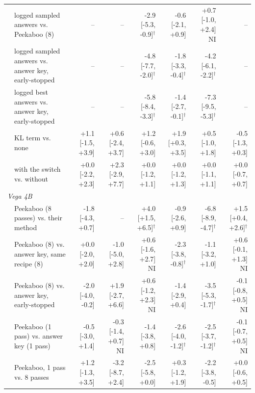 \begin{table}[tbp]
{\begin{tabular}{llrrrrrr}
 & logged sampled answers vs. Peekaboo (8) & -- & -- & -2.9 {\scriptsize[-5.3, -0.9]}$^{\dagger}$ & -0.6 {\scriptsize[-2.1, +0.9]} & +0.7 {\scriptsize[-1.0, +2.4]} NI & -- \\
 & logged sampled answers vs. answer key, early-stopped & -- & -- & -4.8 {\scriptsize[-7.7, -2.0]}$^{\dagger}$ & -1.8 {\scriptsize[-3.3, -0.4]}$^{\dagger}$ & -4.2 {\scriptsize[-6.1, -2.2]}$^{\dagger}$ & -- \\
 & logged best answers vs. answer key, early-stopped & -- & -- & -5.8 {\scriptsize[-8.4, -3.3]}$^{\dagger}$ & -1.4 {\scriptsize[-2.7, -0.1]}$^{\dagger}$ & -7.3 {\scriptsize[-9.5, -5.3]}$^{\dagger}$ & -- \\
 & KL term vs. none & +1.1 {\scriptsize[-1.5, +3.9]} & +0.6 {\scriptsize[-2.4, +3.7]} & +1.2 {\scriptsize[-0.6, +3.0]} & +1.9 {\scriptsize[+0.3, +3.5]} & +0.5 {\scriptsize[-1.0, +1.8]} & -0.5 {\scriptsize[-1.3, +0.3]} \\
 & with the switch vs. without & +0.0 {\scriptsize[-2.2, +2.3]} & +2.3 {\scriptsize[-2.9, +7.7]} & +0.0 {\scriptsize[-1.2, +1.1]} & +0.0 {\scriptsize[-1.2, +1.3]} & +0.0 {\scriptsize[-1.1, +1.1]} & +0.0 {\scriptsize[-0.7, +0.7]} \\
\midrule
\multicolumn{8}{l}{\textit{Vega 4B}} \\
 & Peekaboo (8 passes) vs. their method & -1.8 {\scriptsize[-4.3, +0.7]} & -- & +4.0 {\scriptsize[+1.5, +6.5]}$^{\dagger}$ & -0.9 {\scriptsize[-2.6, +0.9]} & -6.8 {\scriptsize[-8.9, -4.7]}$^{\dagger}$ & +1.5 {\scriptsize[+0.4, +2.6]}$^{\dagger}$ \\
 & Peekaboo (8) vs. answer key, same recipe (8) & +0.0 {\scriptsize[-2.0, +2.0]} & -1.0 {\scriptsize[-5.0, +2.8]} & +0.6 {\scriptsize[-1.6, +2.7]} NI & -2.3 {\scriptsize[-3.8, -0.8]}$^{\dagger}$ & -1.1 {\scriptsize[-3.2, +1.0]} & +0.6 {\scriptsize[-0.1, +1.3]} NI \\
 & Peekaboo (8) vs. answer key, early-stopped & -2.0 {\scriptsize[-4.0, -0.2]} & +1.9 {\scriptsize[-2.7, +6.6]} & +0.6 {\scriptsize[-1.2, +2.3]} NI & -1.4 {\scriptsize[-2.9, +0.4]} & -3.5 {\scriptsize[-5.3, -1.7]}$^{\dagger}$ & -0.1 {\scriptsize[-0.8, +0.5]} NI \\
 & Peekaboo (1 pass) vs. answer key (1 pass) & -0.5 {\scriptsize[-3.0, +1.4]} & -0.3 {\scriptsize[-1.4, +0.7]} NI & -1.4 {\scriptsize[-3.8, +0.8]} & -2.6 {\scriptsize[-4.0, -1.2]}$^{\dagger}$ & -2.5 {\scriptsize[-3.7, -1.2]}$^{\dagger}$ & -0.1 {\scriptsize[-0.7, +0.5]} NI \\
 & Peekaboo, 1 pass vs. 8 passes & +1.2 {\scriptsize[-1.3, +3.5]} & -3.2 {\scriptsize[-8.7, +2.4]} & -2.5 {\scriptsize[-5.8, +0.0]} & +0.3 {\scriptsize[-1.2, +1.9]} & -2.2 {\scriptsize[-3.8, -0.5]} & +0.0 {\scriptsize[-0.6, +0.5]} \\

\end{tabular}}
\end{table}
